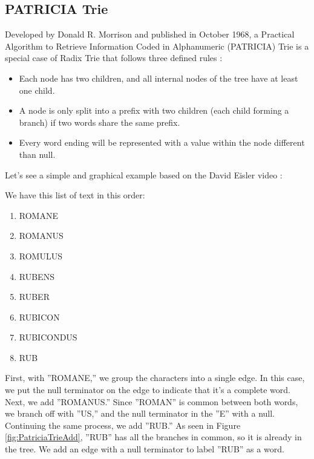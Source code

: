 \documentclass[fleqn,10pt]{olplainarticle}
\begin{document}
\subsection{PATRICIA Trie}

Developed by Donald R. Morrison and published in October 1968, a Practical Algorithm to Retrieve Information Coded in Alphanumeric (PATRICIA) Trie is a special case of Radix Trie that follows three defined rules \cite{osiek_patricia_2020,eisler_trie_2013}:

\begin{itemize}[noitemsep]
	\item Each node has two children, and all internal nodes of the tree have at least one child.
	\item A node is only split into a prefix with two children (each child forming a branch) if two words share the same prefix.
	\item Every word ending will be represented with a value within the node different than null.
\end{itemize}

Let's see a simple and graphical example based on the David Eisler video \cite{eisler_trie_2013}:

We have this list of text in this order:

\begin{multicols}{4}
	\begin{enumerate}[noitemsep]
		\item ROMANE
		\item ROMANUS
		\item ROMULUS
		\item RUBENS
		\item RUBER
		\item RUBICON
		\item RUBICONDUS
		\item RUB
	\end{enumerate}
\end{multicols}

First, with ''ROMANE,'' we group the characters into a single edge. In this case, we put the null terminator on the edge to indicate that it's a complete word. Next, we add ''ROMANUS.'' Since ''ROMAN'' is common between both words, we branch off with ''US,'' and the null terminator in the ''E'' with a null. Continuing the same process, we add ''RUB.'' As seen in Figure \ref{fig:PatriciaTrieAdd}, ''RUB'' has all the branches in common, so it is already in the tree. We add an edge with a null terminator to label ''RUB'' as a word.
\end{document}
